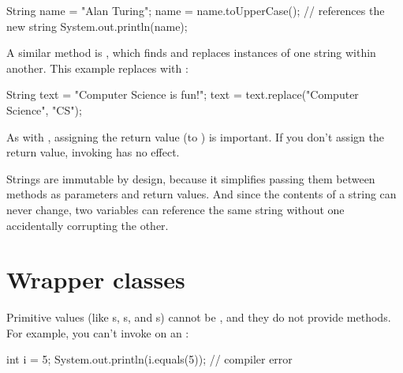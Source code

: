 \begin{code}
String name = "Alan Turing";
name = name.toUpperCase();    // references the new string
System.out.println(name);
\end{code}


A similar method is , which finds and replaces instances of one string within another.
This example replaces  with :

\begin{code}
String text = "Computer Science is fun!";
text = text.replace("Computer Science", "CS");
\end{code}


As with , assigning the return value (to ) is important.
If you don't assign the return value, invoking  has no effect.


Strings are immutable by design, because it simplifies passing them between methods as parameters and return values.
And since the contents of a string can never change, two variables can reference the same string without one accidentally corrupting the other.


\section{Wrapper classes}

Primitive values (like s, s, and s) cannot be , and they do not provide methods.
For example, you can't invoke  on an :

\begin{code}
int i = 5;
System.out.println(i.equals(5));  // compiler error
\end{code}

